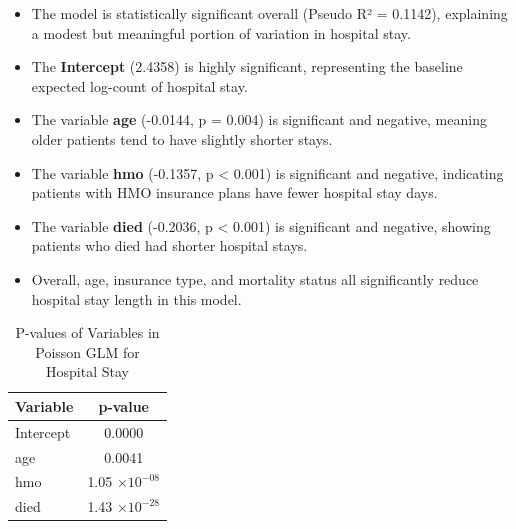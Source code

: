 \documentclass[12pt,a4paper]{report}
\begin{document}
\begin{tcolorbox}[colback=blue!5!white,colframe=blue!70!black,title=Interpretation]
\begin{itemize}
    \item The model is statistically significant overall (Pseudo R² = 0.1142), explaining a modest but meaningful portion of variation in hospital stay.
    \item The \textbf{Intercept} (2.4358) is highly significant, representing the baseline expected log-count of hospital stay.
    \item The variable \textbf{age} (-0.0144, p = 0.004) is significant and negative, meaning older patients tend to have slightly shorter stays.
    \item The variable \textbf{hmo} (-0.1357, p < 0.001) is significant and negative, indicating patients with HMO insurance plans have fewer hospital stay days.
    \item The variable \textbf{died} (-0.2036, p < 0.001) is significant and negative, showing patients who died had shorter hospital stays.
    \item Overall, age, insurance type, and mortality status all significantly reduce hospital stay length in this model.
\end{itemize}
\end{tcolorbox}
\begin{table}[h!]
\centering
\begin{tabular}{|l|c|}
\hline
\textbf{Variable} & \textbf{p-value} \\ \hline
Intercept & 0.0000 \\ \hline
age       & 0.0041 \\ \hline
hmo       & 1.05 $\times 10^{-08}$ \\ \hline
died      & 1.43 $\times 10^{-28}$ \\ \hline
\end{tabular}
\caption{P-values of Variables in Poisson GLM for Hospital Stay}
\label{tab:pvalues_stay}
\end{table}
\end{document}
